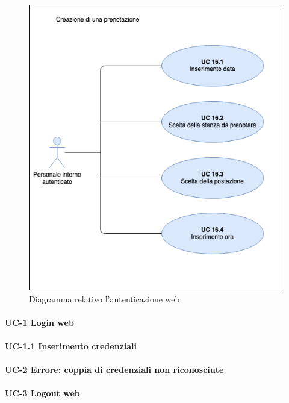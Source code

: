 \begin{figure}[H]
    \centering
      \includegraphics[scale=0.80]{src/CasiDUso/immagini/UC-creazionePrenotazione.png}
    \caption{Diagramma relativo l'autenticazione web}
\end{figure}

\paragraph{UC-1 Login web}

\paragraph{UC-1.1 Inserimento credenziali}

\paragraph{UC-2 Errore: coppia di credenziali non riconosciute}

\paragraph{UC-3 Logout web}


